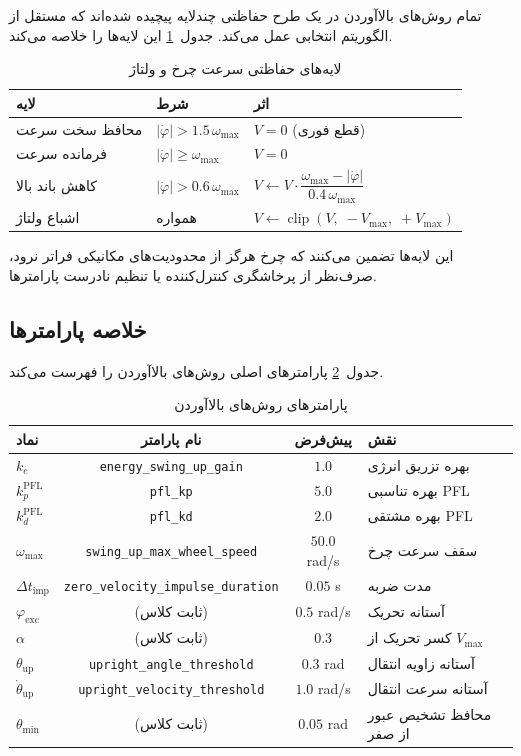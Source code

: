 تمام روش‌های بالاآوردن در یک طرح حفاظتی چندلایه پیچیده شده‌اند که مستقل از الگوریتم انتخابی عمل می‌کند. جدول~\ref{tab:safety} این لایه‌ها را خلاصه می‌کند.

\begin{table}[H]
\centering
\caption{لایه‌های حفاظتی سرعت چرخ و ولتاژ}
\label{tab:safety}
\begin{tabular}{lll}
\toprule
\textbf{لایه} & \textbf{شرط} & \textbf{اثر} \\
\midrule
محافظ سخت سرعت & $|\dot\varphi| > 1.5\,\omega_{\max}$ & $V = 0$ (قطع فوری) \\
فرمانده سرعت & $|\dot\varphi| \geq \omega_{\max}$ & $V = 0$ \\
کاهش باند بالا & $|\dot\varphi| > 0.6\,\omega_{\max}$ & $V \leftarrow V \cdot \dfrac{\omega_{\max} - |\dot\varphi|}{0.4\,\omega_{\max}}$ \\
اشباع ولتاژ & همواره & $V \leftarrow \operatorname{clip}(V,\; -V_{\max},\; +V_{\max})$ \\
\bottomrule
\end{tabular}
\end{table}

این لایه‌ها تضمین می‌کنند که چرخ هرگز از محدودیت‌های مکانیکی فراتر نرود، صرف‌نظر از پرخاشگری کنترل‌کننده یا تنظیم نادرست پارامترها.

\subsection{خلاصه پارامترها}

جدول~\ref{tab:swingup-params} پارامترهای اصلی روش‌های بالاآوردن را فهرست می‌کند.

\begin{table}[H]
\centering
\caption{پارامترهای روش‌های بالاآوردن}
\label{tab:swingup-params}
\begin{tabular}{lccl}
\toprule
\textbf{نماد} & \textbf{نام پارامتر} & \textbf{پیش‌فرض} & \textbf{نقش} \\
\midrule
$k_e$ & \texttt{energy\_swing\_up\_gain} & $1.0$ & بهره تزریق انرژی \\
$k_p^{\text{PFL}}$ & \texttt{pfl\_kp} & $5.0$ & بهره تناسبی PFL \\
$k_d^{\text{PFL}}$ & \texttt{pfl\_kd} & $2.0$ & بهره مشتقی PFL \\
$\omega_{\max}$ & \texttt{swing\_up\_max\_wheel\_speed} & $50.0$ rad/s & سقف سرعت چرخ \\
$\Delta t_{\text{imp}}$ & \texttt{zero\_velocity\_impulse\_duration} & $0.05$ s & مدت ضربه \\
$\varphi_{\text{exc}}$ & (ثابت کلاس) & $0.5$ rad/s & آستانه تحریک \\
$\alpha$ & (ثابت کلاس) & $0.3$ & کسر تحریک از $V_{\max}$ \\
$\theta_{\text{up}}$ & \texttt{upright\_angle\_threshold} & $0.3$ rad & آستانه زاویه انتقال \\
$\dot\theta_{\text{up}}$ & \texttt{upright\_velocity\_threshold} & $1.0$ rad/s & آستانه سرعت انتقال \\
$\theta_{\min}$ & (ثابت کلاس) & $0.05$ rad & محافظ تشخیص عبور از صفر \\
\bottomrule
\end{tabular}
\end{table}

